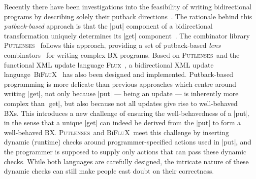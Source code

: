 \documentclass{sigplanconf}
\renewcommand{\emph}{\textsl}
\newcommand{\Putlenses}{\textsc{Putlenses}}
\newcommand{\BiFluX}{\textsc{BiFluX}}
\begin{document}
Recently there have been investigations into the feasibility of writing bidirectional programs by describing solely their putback directions~\cite{Hu-putback-validity, Pacheco-putlenses, Pacheco-BiFluX}.
The rationale behind this \emph{putback-based} approach is that the |put| component of a bidirectional transformation uniquely determines its |get| component~\cite[Lemma~2.2.5]{Foster:09}.
The combinator library \Putlenses~\cite{Pacheco-putlenses} follows this approach, providing a set of putback-based \emph{lens} combinators~\cite{Foster-lenses} for writing complex BX programs.
Based on \Putlenses\ and the functional XML update language \textsc{Flux}~\cite{Cheney-FLUX}, a bidirectional XML update language~\BiFluX~\cite{Pacheco-BiFluX} has also been designed and implemented.
Putback-based programming is more delicate than previous approaches which centre around writing |get|, not only because |put| --- being an update --- is inherently more complex than |get|, but also because not all updates give rise to well-behaved BXs.
This introduces a new challenge of ensuring the well-behavedness of a |put|, in the sense that a unique |get| can indeed be derived from the |put| to form a well-behaved BX.
\Putlenses\ and \BiFluX\ meet this challenge by inserting dynamic (runtime) checks around programmer-specified actions used in |put|, and the programmer is supposed to supply only actions that can pass these dynamic checks.
While both languages are carefully designed, the intricate nature of these dynamic checks can still make people cast doubt on their correctness.

%
\end{document}
